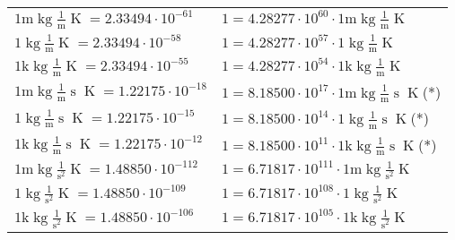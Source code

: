 \begin{center}
\begin{longtable}{l l}
{\color{gray}$1 \bm{\mathrm{ m}}\operatorname{kg}\frac1{\operatorname{m}}{}{}{\operatorname{K}} = 2.33494\cdot10^{-61} $}   & {\color{gray}$ 1 = 4.28277\cdot10^{60} \cdot 1 \bm{\mathrm{ m}}\operatorname{kg}\frac1{\operatorname{m}}{}{}{\operatorname{K}}$}  \\
{\color{black}$1 \bm{\mathrm{ }}\operatorname{kg}\frac1{\operatorname{m}}{}{}{\operatorname{K}} = 2.33494\cdot10^{-58} $}   & {\color{black}$ 1 = 4.28277\cdot10^{57} \cdot 1 \bm{\mathrm{ }}\operatorname{kg}\frac1{\operatorname{m}}{}{}{\operatorname{K}}$}  \\
{\color{gray}$1 \bm{\mathrm{ k}}\operatorname{kg}\frac1{\operatorname{m}}{}{}{\operatorname{K}} = 2.33494\cdot10^{-55} $}   & {\color{gray}$ 1 = 4.28277\cdot10^{54} \cdot 1 \bm{\mathrm{ k}}\operatorname{kg}\frac1{\operatorname{m}}{}{}{\operatorname{K}}$}  \\
{\color{gray}$1 \bm{\mathrm{ m}}\operatorname{kg}\frac1{\operatorname{m}}{\operatorname{s}}{}{\operatorname{K}} = 1.22175\cdot10^{-18} $}   & {\color{gray}$ 1 = 8.18500\cdot10^{17} \cdot 1 \bm{\mathrm{ m}}\operatorname{kg}\frac1{\operatorname{m}}{\operatorname{s}}{}{\operatorname{K}}$}\quad(*)\\
{\color{black}$1 \bm{\mathrm{ }}\operatorname{kg}\frac1{\operatorname{m}}{\operatorname{s}}{}{\operatorname{K}} = 1.22175\cdot10^{-15} $}   & {\color{black}$ 1 = 8.18500\cdot10^{14} \cdot 1 \bm{\mathrm{ }}\operatorname{kg}\frac1{\operatorname{m}}{\operatorname{s}}{}{\operatorname{K}}$}\quad(*)\\
{\color{gray}$1 \bm{\mathrm{ k}}\operatorname{kg}\frac1{\operatorname{m}}{\operatorname{s}}{}{\operatorname{K}} = 1.22175\cdot10^{-12} $}   & {\color{gray}$ 1 = 8.18500\cdot10^{11} \cdot 1 \bm{\mathrm{ k}}\operatorname{kg}\frac1{\operatorname{m}}{\operatorname{s}}{}{\operatorname{K}}$}\quad(*)\\
{\color{gray}$1 \bm{\mathrm{ m}}\operatorname{kg}{}\frac1{\operatorname{s}^2}{}{\operatorname{K}} = 1.48850\cdot10^{-112} $}   & {\color{gray}$ 1 = 6.71817\cdot10^{111} \cdot 1 \bm{\mathrm{ m}}\operatorname{kg}{}\frac1{\operatorname{s}^2}{}{\operatorname{K}}$}  \\
{\color{black}$1 \bm{\mathrm{ }}\operatorname{kg}{}\frac1{\operatorname{s}^2}{}{\operatorname{K}} = 1.48850\cdot10^{-109} $}   & {\color{black}$ 1 = 6.71817\cdot10^{108} \cdot 1 \bm{\mathrm{ }}\operatorname{kg}{}\frac1{\operatorname{s}^2}{}{\operatorname{K}}$}  \\
{\color{gray}$1 \bm{\mathrm{ k}}\operatorname{kg}{}\frac1{\operatorname{s}^2}{}{\operatorname{K}} = 1.48850\cdot10^{-106} $}   & {\color{gray}$ 1 = 6.71817\cdot10^{105} \cdot 1 \bm{\mathrm{ k}}\operatorname{kg}{}\frac1{\operatorname{s}^2}{}{\operatorname{K}}$}  \\

\end{longtable}
\end{center}
